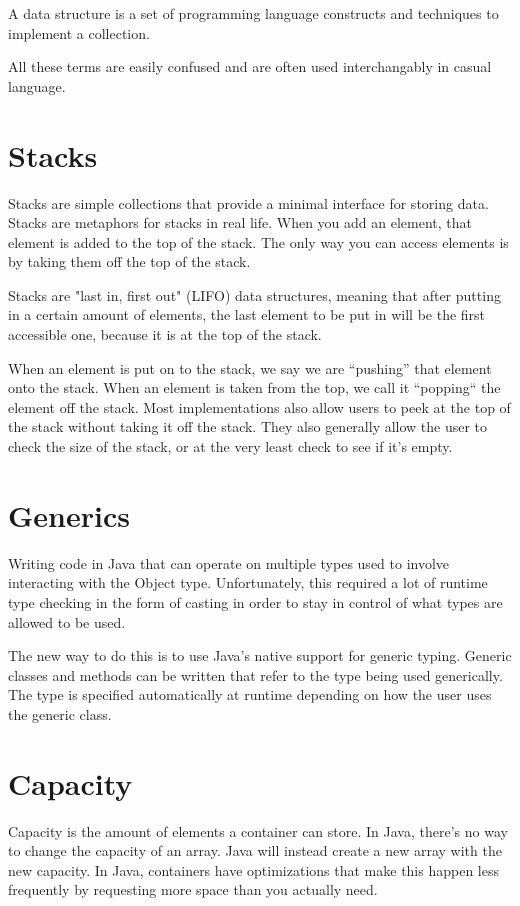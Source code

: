 \documentclass{article}
\begin{document}
A data structure is a set of programming language constructs and techniques to
implement a collection.

All these terms are easily confused and are often used interchangably in casual
language.

\section{Stacks}
Stacks are simple collections that provide a minimal interface for storing
data. Stacks are metaphors for stacks in real life. When you add an element,
that element is added to the top of the stack. The only way you can access
elements is by taking them off the top of the stack.

Stacks are "last in, first out" (LIFO) data structures, meaning that after
putting in a certain amount of elements, the last element to be put in will be
the first accessible one, because it is at the top of the stack.

When an element is put on to the stack, we say we are ``pushing'' that element
onto the stack. When an element is taken from the top, we call it ``popping``
the element off the stack. Most implementations also allow users to peek at the
top of the stack without taking it off the stack. They also generally allow the
user to check the size of the stack, or at the very least check to see if it's
empty.

\section{Generics}
Writing code in Java that can operate on multiple types used to involve
interacting with the Object type. Unfortunately, this required a lot of runtime
type checking in the form of casting in order to stay in control of what types
are allowed to be used.

The new way to do this is to use Java's native support for generic typing.
Generic classes and methods can be written that refer to the type being used
generically. The type is specified automatically at runtime depending on how
the user uses the generic class.

\section{Capacity}
Capacity is the amount of elements a container can store. In Java, there's no
way to change the capacity of an array. Java will instead create a new array
with the new capacity. In Java, containers have optimizations that make this
happen less frequently by requesting more space than you actually need.
\end{document}
